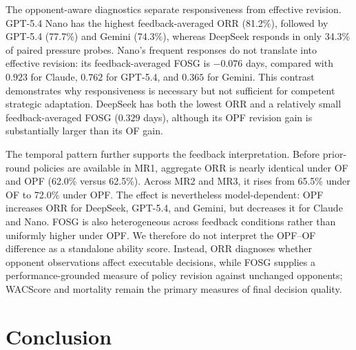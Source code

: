 \documentclass[letterpaper]{article} %
\begin{document}
The opponent-aware diagnostics separate responsiveness from effective
revision. GPT-5.4 Nano has the highest feedback-averaged ORR (81.2\%),
followed by GPT-5.4 (77.7\%) and Gemini (74.3\%), whereas DeepSeek
responds in only 34.3\% of paired pressure probes. Nano's frequent
responses do not translate into effective revision: its
feedback-averaged FOSG is $-0.076$ days, compared with $0.923$ for
Claude, $0.762$ for GPT-5.4, and $0.365$ for Gemini. This contrast
demonstrates why responsiveness is necessary but not sufficient for
competent strategic adaptation. DeepSeek has both the lowest ORR and a
relatively small feedback-averaged FOSG ($0.329$ days), although its OPF
revision gain is substantially larger than its OF gain.

The temporal pattern further supports the feedback interpretation.
Before prior-round policies are available in MR1, aggregate ORR is
nearly identical under OF and OPF (62.0\% versus 62.5\%). Across MR2
and MR3, it rises from 65.5\% under OF to 72.0\% under OPF. The effect
is nevertheless model-dependent: OPF increases ORR for DeepSeek,
GPT-5.4, and Gemini, but decreases it for Claude and Nano. FOSG is also
heterogeneous across feedback conditions rather than uniformly higher
under OPF. We therefore do not interpret the OPF--OF difference as a
standalone ability score. Instead, ORR diagnoses whether opponent
observations affect executable decisions, while FOSG supplies a
performance-grounded measure of policy revision against unchanged
opponents; WACScore and mortality remain the primary measures of final
decision quality.

\section{Conclusion}


\end{document}
